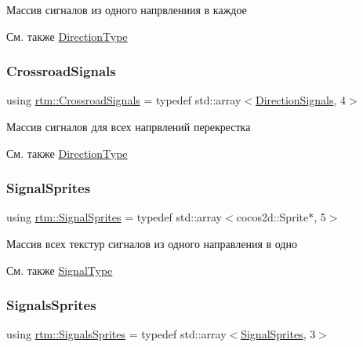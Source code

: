 Массив сигналов из одного напрвлениия в каждое \begin{DoxySeeAlso}{См. также}
\hyperlink{namespacertm_a57b216f3aeb45041f3461bab08bc3aeb}{Direction\+Type} 
\end{DoxySeeAlso}
\mbox{\label{namespacertm_afa6df86cef8e2ebcc053ad994e440354}} 
\subsubsection{\texorpdfstring{Crossroad\+Signals}{CrossroadSignals}}
{\footnotesize\ttfamily using \hyperlink{namespacertm_afa6df86cef8e2ebcc053ad994e440354}{rtm\+::\+Crossroad\+Signals} = typedef std\+::array$<$\hyperlink{namespacertm_a681634e130c2137fe63a658b0e0a5e46}{Direction\+Signals}, 4$>$}

Массив сигналов для всех напрвлений перекрестка \begin{DoxySeeAlso}{См. также}
\hyperlink{namespacertm_a57b216f3aeb45041f3461bab08bc3aeb}{Direction\+Type} 
\end{DoxySeeAlso}
\mbox{\label{namespacertm_ab6c6acbd1378bfe5755d77179a7131ff}} 
\subsubsection{\texorpdfstring{Signal\+Sprites}{SignalSprites}}
{\footnotesize\ttfamily using \hyperlink{namespacertm_ab6c6acbd1378bfe5755d77179a7131ff}{rtm\+::\+Signal\+Sprites} = typedef std\+::array$<$cocos2d\+::\+Sprite$\ast$, 5$>$}

Массив всех текстур сигналов из одного направления в одно \begin{DoxySeeAlso}{См. также}
\hyperlink{namespacertm_aadb7300c15d57429546fb0b7f8ee0ee6}{Signal\+Type} 
\end{DoxySeeAlso}
\mbox{\label{namespacertm_a260109b3376dc38095724ee80ed72d8e}} 
\subsubsection{\texorpdfstring{Signals\+Sprites}{SignalsSprites}}
{\footnotesize\ttfamily using \hyperlink{namespacertm_a260109b3376dc38095724ee80ed72d8e}{rtm\+::\+Signals\+Sprites} = typedef std\+::array$<$\hyperlink{namespacertm_ab6c6acbd1378bfe5755d77179a7131ff}{Signal\+Sprites}, 3$>$}

